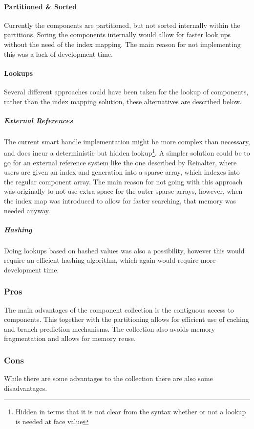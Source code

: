 \paragraph{Partitioned \& Sorted}
Currently the components are partitioned, but not sorted internally within the partitions.
Soring the components internally would allow for faster look ups without the need of the index mapping.
The main reason for not implementing this was a lack of development time.

\paragraph{Lookups}
Several different approaches could have been taken for the lookup of components, rather than the index mapping solution,
these alternatives are described below.

\subparagraph{External References}
The current smart handle implementation might be more complex than necessary, and does incur a deterministic but hidden lookup\footnote{Hidden in terms that it is not clear from the syntax whether or not a lookup is needed at face value}.
A simpler solution could be to go for an external reference system like the one described by Reinalter\cite{molecular_matters_dod_external_references},
where users are given an index and generation into a sparse array, which indexes into the regular component array.
The main reason for not going with this approach was originally to not use extra space for the outer sparse arrays,
however, when the index map was introduced to allow for faster searching, that memory was needed anyway.

\subparagraph{Hashing}
Doing lookups based on hashed values was also a possibility, however this would require an efficient hashing algorithm,
which again would require more development time.

\subsubsection{Pros}
The main advantages of the component collection is the contiguous access to components.
This together with the partitioning allows for efficient use of caching and branch prediction mechanisms.
The collection also avoids memory fragmentation and allows for memory reuse.

\subsubsection{Cons}
While there are some advantages to the collection there are also some disadvantages.

